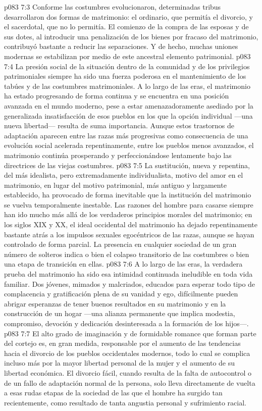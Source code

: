 \vs p083 7:3 Conforme las costumbres evolucionaron, determinadas tribus desarrollaron dos formas de matrimonio: el ordinario, que permitía el divorcio, y el sacerdotal, que no lo permitía. El comienzo de la compra de las esposas y de sus dotes, al introducir una penalización de los bienes por fracaso del matrimonio, contribuyó bastante a reducir las separaciones. Y de hecho, muchas uniones modernas se estabilizan por medio de este ancestral elemento patrimonial.
\vs p083 7:4 La presión social de la situación dentro de la comunidad y de los privilegios patrimoniales siempre ha sido una fuerza poderosa en el mantenimiento de los tabúes y de las costumbres matrimoniales. A lo largo de las eras, el matrimonio ha estado progresando de forma continua y se encuentra en una posición avanzada en el mundo moderno, pese a estar amenazadoramente asediado por la generalizada insatisfacción de esos pueblos en los que la opción individual ---una nueva libertad--- resulta de suma importancia. Aunque estos trastornos de adaptación aparecen entre las razas más progresivas como consecuencia de una evolución social acelerada repentinamente, entre los pueblos menos avanzados, el matrimonio continúa prosperando y perfeccionándose lentamente bajo las directrices de las viejas costumbres.
\vs p083 7:5 La sustitución, nueva y repentina, del más idealista, pero extremadamente individualista, motivo del amor en el matrimonio, en lugar del motivo patrimonial, más antiguo y largamente establecido, ha provocado de forma inevitable que la institución del matrimonio se vuelva temporalmente inestable. Las razones del hombre para casarse siempre han ido mucho más allá de los verdaderos principios morales del matrimonio; en los siglos XIX y XX, el ideal occidental del matrimonio ha dejado repentinamente bastante atrás a los impulsos sexuales egocéntricos de las razas, aunque se hayan controlado de forma parcial. La presencia en cualquier sociedad de un gran número de solteros indica o bien el colapso transitorio de las costumbres o bien una etapa de transición en ellas.
\vs p083 7:6 A lo largo de las eras, la verdadera prueba del matrimonio ha sido esa intimidad continuada ineludible en toda vida familiar. Dos jóvenes, mimados y malcriados, educados para esperar todo tipo de complacencia y gratificación plena de su vanidad y ego, difícilmente pueden abrigar esperanzas de tener buenos resultados en su matrimonio y en la construcción de un hogar ---una alianza permanente que implica modestia, compromiso, devoción y dedicación desinteresada a la formación de los hijos---.
\vs p083 7:7 El alto grado de imaginación y de formidable romance que forman parte del cortejo es, en gran medida, responsable por el aumento de las tendencias hacia el divorcio de los pueblos occidentales modernos, todo lo cual se complica incluso más por la mayor libertad personal de la mujer y el aumento de su libertad económica. El divorcio fácil, cuando resulta de la falta de autocontrol o de un fallo de adaptación normal de la persona, solo lleva directamente de vuelta a esas rudas etapas de la sociedad de las que el hombre ha surgido tan recientemente, como resultado de tanta angustia personal y sufrimiento racial.

